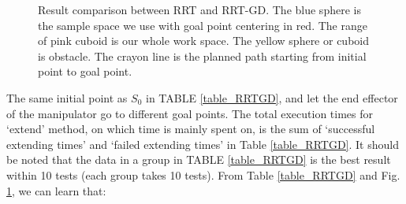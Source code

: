 \documentclass[letterpaper, 10 pt, conference]{ieeeconf}  %
\begin{document}
\begin{figure}[thpb]
      \framebox{
      \parbox{6.6in}{
      \centerline{
      \subfigure[RRT in Group No.1 of Table \ref{table_RRTGD}]
      {
      \label{Subfig.1}
      \texttt{[image: RRT1.eps]}	
      }
      \hfil
      \subfigure[RRT-GD in Group No.1 of Table \ref{table_RRTGD}]
      {
      \label{Subfig.2}
      \texttt{[image: RRTGD1.eps]}	
      }
      }
      \hfil
      \subfigure[RRT in Group No.2 of Table \ref{table_RRTGD}]
      {
      \label{Subfig.3}
      \texttt{[image: RRT2.eps]}
      }
      \hfil
      \subfigure[RRT-GD in Group No.1 of Table \ref{table_RRTGD}]
      {
      \label{Subfig.4}
      \texttt{[image: RRTGD2.eps]}	
      }
      }
      }
      \caption{Result comparison between RRT and RRT-GD. The blue sphere is the sample space we use with goal point centering in red. The range of pink cuboid is our whole work space. The yellow sphere or cuboid is obstacle. The crayon line is the planned path starting from initial point to goal point. }
      \label{fig_final}
\end{figure}

The same initial point as $S_{0}$ in TABLE \ref{table_RRTGD}, and let the end effector of the manipulator go to different goal points. The total execution times for `extend' method, on which time is mainly spent on, is the sum of `successful extending times' and `failed extending times' in Table \ref{table_RRTGD}. It should be noted that the data in a group in TABLE \ref{table_RRTGD} is the best result within 10 tests (each group takes 10 tests). From Table \ref{table_RRTGD} and Fig. \ref{fig_final}, we can learn that:
\end{document}
